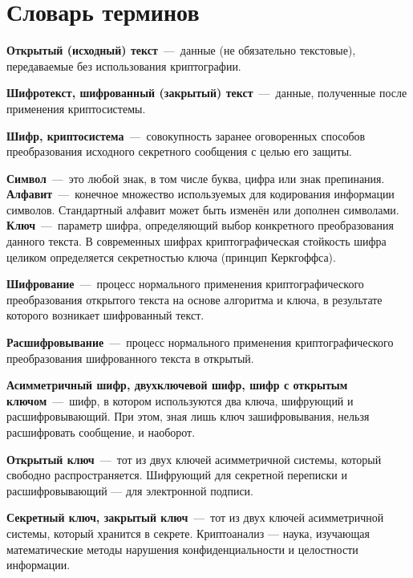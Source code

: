 \chapter*{Словарь терминов}             %

\textbf{Открытый (исходный) текст}~---~данные (не обязательно текстовые),
передаваемые без использования криптографии.

\textbf{Шифротекст, шифрованный (закрытый) текст}~---~данные, полученные
после применения криптосистемы.

\textbf{Шифр, криптосистема}~---~совокупность заранее оговоренных способов преобразования исходного секретного сообщения с целью его защиты.%

\textbf{Символ}~---~это любой знак, в том числе буква, цифра или знак
препинания.
\\
\textbf{Алфавит}~---~конечное множество используемых для кодирования
информации символов. Стандартный алфавит может быть изменён или дополнен
символами.
\\
\textbf{Ключ}~---~параметр шифра, определяющий выбор конкретного
преобразования данного текста. В современных шифрах криптографическая
стойкость шифра целиком определяется секретностью ключа (принцип Керкгоффса).

\textbf{Шифрование}~---~процесс нормального применения криптографического
преобразования открытого текста на основе алгоритма и ключа, в результате
которого возникает шифрованный текст.

\textbf{Расшифровывание}~---~процесс нормального применения
криптографического преобразования шифрованного текста в открытый.

\textbf{Асимметричный шифр, двухключевой шифр, шифр с открытым
ключом}~---~шифр, в котором используются два ключа, шифрующий и
расшифровывающий. При этом, зная лишь ключ зашифровывания, нельзя
расшифровать сообщение, и наоборот.

\textbf{Открытый ключ}~---~тот из двух ключей асимметричной системы, который
свободно распространяется. Шифрующий для секретной переписки и
расшифровывающий — для электронной подписи.

\textbf{Секретный ключ, закрытый ключ}~---~тот из двух ключей асимметричной
системы, который хранится в секрете. Криптоанализ — наука, изучающая
математические методы нарушения конфиденциальности и целостности информации.

